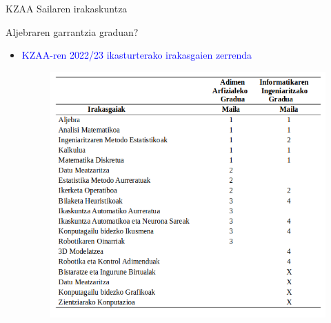 \documentclass[
 10pt,%
 compress,%
 t,       %
 xcolor=svgnames
]{beamer}
\theoremstyle{definition} \newtheorem{definicion}{Definicion}[section]
\theoremstyle{propiedades} \newtheorem{propiedades}{Propiedades}[section]
\begin{document}

\begin{frame}{KZAA Sailaren irakaskuntza} 

\medskip


\centering \color{red}  Aljebraren garrantzia graduan?

\medskip
\small

\begin{itemize}

\item \textcolor{blue}{KZAA-ren  2022/23 ikasturterako irakasgaien zerrenda}


\medskip
\begin{figure}
	\quad
	\begin{minipage}{0.8\textwidth}
		\colorbox{white}  {\includegraphics[width=0.8\linewidth]{KZAA_Irakasgaiak}}
	\end{minipage}
\end{figure}

\end{itemize}

\note{


\begin{itemize} 




\end{itemize}}
\end{frame}
\end{document}
